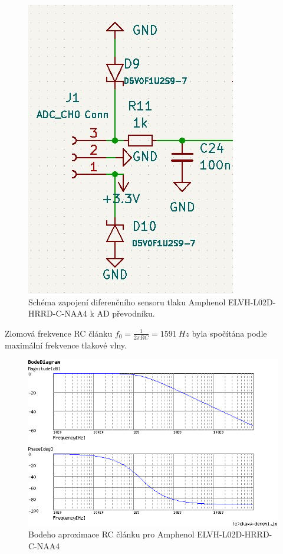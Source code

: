 \begin{figure}[H]
    \centering
    \includegraphics{pictures/diff_sen_circuit.jpg}
    \caption{Schéma zapojení diferenčního sensoru tlaku Amphenol ELVH-L02D-HRRD-C-NAA4 k AD převodníku.}
    \label{fig:amphenol_circuit}
\end{figure}

Zlomová frekvence RC článku $f_0 = \frac{1}{2 \pi RC} = 1591 \ Hz $ byla spočítána podle maximální frekvence tlakové vlny. 
\begin{figure}[H]
    \centering
    \includegraphics{pictures/rc_1k_100n_1591.png}
    \caption{Bodeho aproximace RC článku pro Amphenol ELVH-L02D-HRRD-C-NAA4}
    \label{fig:amphenol_filter}
\end{figure}

